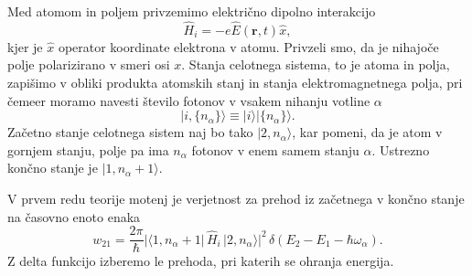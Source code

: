 Med atomom in poljem privzemimo električno dipolno interakcijo 
\begin{equation}
\hat{H}_{i}=-e\hat{E}(\mathbf{r},t)\hat{x},
\label{4.47}
\end{equation}
kjer je $\hat{x}$ operator koordinate elektrona v atomu. Privzeli
smo, da je nihajoče polje polarizirano v smeri osi $x$. Stanja celotnega sistema, 
to je atoma in polja, zapišimo v obliki produkta atomskih stanj in
stanja elektromagnetnega polja, pri čemeer moramo navesti število fotonov
v vsakem nihanju votline $\alpha$
\begin{equation}
|i,\{n_{\alpha}\}\rangle\equiv|i\rangle|\{n_{\alpha}\}\rangle.
\label{4.48}
\end{equation}
Začetno stanje celotnega sistem naj bo tako $|2,n_{\alpha}\rangle$, kar pomeni, da je
atom v gornjem stanju, polje pa ima $n_{\alpha}$ fotonov v enem samem stanju $\alpha$.
Ustrezno končno stanje je $|1,n_{\alpha}+1\rangle$.

V prvem redu teorije motenj je verjetnost za prehod iz začetnega v končno stanje
na časovno enoto enaka
\begin{equation}
w_{21}=\frac{2\pi}{\hbar}|\langle1,n_{\alpha}+
1|\,\hat{H}_{i}\,|2,n_{\alpha}\rangle|^{2}\,
\delta(E_{2}-E_{1}-\hbar\omega_{\alpha}).
\label{4.49}
\end{equation}
Z delta funkcijo izberemo le prehoda, pri katerih se ohranja
energija.


